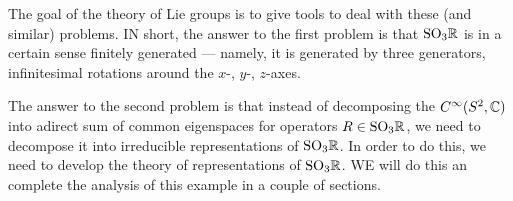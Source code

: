 The goal of the theory of Lie groups is to give tools to deal with these
(and similar) problems. IN short, the answer to the first problem is that
$\mathrm{SO}_3\mathbb{R}$ is in a certain sense finitely generated --- namely, it is
generated by three generators, infinitesimal rotations around the $x$-,
$y$-, $z$-axes.

The answer to the second problem is that instead of decomposing the
$C^\infty(S^2,\mathbb{C})$ into adirect sum of common eigenspaces for operators
$R\in\mathrm{SO}_3\mathbb{R}$, we need to decompose it into irreducible representations
of $\mathrm{SO}_3\mathbb{R}$. In order to do this, we need to develop the theory of
representations of $\mathrm{SO}_3\mathbb{R}$. WE will do this an complete the analysis of
this example in a couple of sections.


